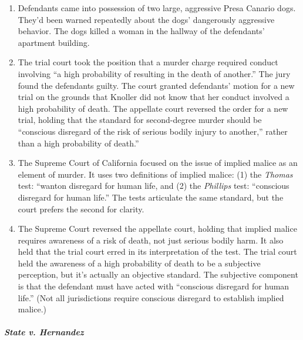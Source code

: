 \begin{enumerate}
    \item Defendants came into possession of two large, aggressive Presa Canario dogs. They'd been warned repeatedly about the dogs' dangerously aggressive behavior. The dogs killed a woman in the hallway of the defendants' apartment building.
    \item The trial court took the position that a murder charge required conduct involving ``a high probability of resulting in the death of another.'' The jury found the defendants guilty. The court granted defendants' motion for a new trial on the grounds that Knoller did not know that her conduct involved a high probability of death. The appellate court reversed the order for a new trial, holding that the standard for second-degree murder should be ``conscious disregard of the risk of serious bodily injury to another,'' rather than a high probability of death.''
    \item The Supreme Court of California focused on the issue of implied malice as an element of murder. It uses two definitions of implied malice: (1) the \emph{Thomas} test: ``wanton disregard for human life, and (2) the \emph{Phillips} test: ``conscious disregard for human life.'' The tests articulate the same standard, but the court prefers the second for clarity.
    \item The Supreme Court reversed the appellate court, holding that implied malice requires awareness of a risk of death, not just serious bodily harm. It also held that the trial court erred in its interpretation of the test. The trial court held the awareness of a high probability of death to be a subjective perception, but it's actually an objective standard. The subjective component is that the defendant must have acted with ``conscious disregard for human life.'' (Not all jurisdictions require conscious disregard to establish implied malice.)
\end{enumerate}

\paragraph{\emph{State v. Hernandez}}

